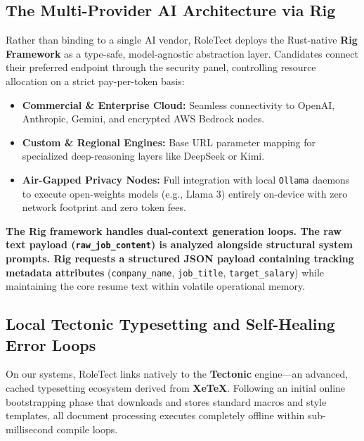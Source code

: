 \documentclass[10pt,a4paper]{article}
\begin{document}
\subsection{The Multi-Provider AI Architecture via Rig}
Rather than binding to a single AI vendor, RoleTect deploys the Rust-native \textbf{Rig Framework} as a type-safe, model-agnostic abstraction layer. Candidates connect their preferred endpoint through the security panel, controlling resource allocation on a strict pay-per-token basis:
\begin{itemize}
    \item \textbf{Commercial \& Enterprise Cloud:} Seamless connectivity to OpenAI, Anthropic, Gemini, and encrypted AWS Bedrock nodes.
    \item \textbf{Custom \& Regional Engines:} Base URL parameter mapping for specialized deep-reasoning layers like DeepSeek or Kimi.
    \item \textbf{Air-Gapped Privacy Nodes:} Full integration with local \texttt{Ollama} daemons to execute open-weights models (e.g., Llama 3) entirely on-device with zero network footprint and zero token fees.
\end{itemize}

\textbf{The Rig framework handles dual-context generation loops. The raw text payload (\texttt{raw\_job\_content}) is analyzed alongside structural system prompts. Rig requests a structured JSON payload containing tracking metadata attributes }(\texttt{company\_name}, \texttt{job\_title}, \texttt{target\_salary}) while maintaining the core resume text within volatile operational memory.














\subsection{Local Tectonic Typesetting and Self-Healing Error Loops}
On our systems, RoleTect links natively to the \textbf{Tectonic} engine—an advanced, cached typesetting ecosystem derived from \textbf{XeTeX}. Following an initial online bootstrapping phase that downloads and stores standard macros and style templates, all document processing executes completely offline within sub-millisecond compile loops.
\end{document}
